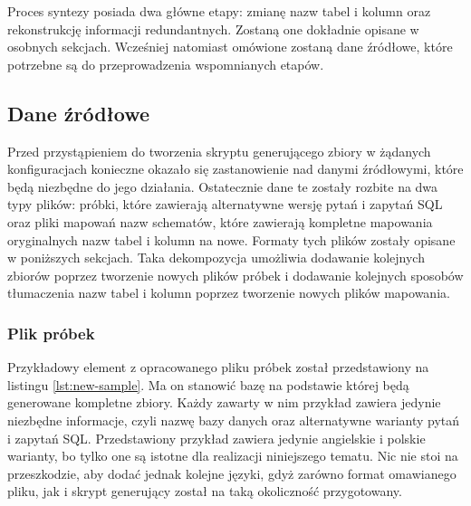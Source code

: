 Proces syntezy posiada dwa główne etapy: zmianę nazw tabel i kolumn oraz rekonstrukcję informacji redundantnych. Zostaną one dokładnie opisane w osobnych sekcjach. Wcześniej natomiast omówione zostaną dane źródłowe, które potrzebne są do przeprowadzenia wspomnianych etapów.

\subsection{Dane źródłowe}
Przed przystąpieniem do tworzenia skryptu generującego zbiory w żądanych konfiguracjach konieczne okazało się zastanowienie nad danymi źródłowymi, które będą niezbędne do jego działania. Ostatecznie dane te zostały rozbite na dwa typy plików: próbki, które zawierają alternatywne wersję pytań i zapytań SQL oraz pliki mapowań nazw schematów, które zawierają kompletne mapowania oryginalnych nazw tabel i kolumn na nowe. Formaty tych plików zostały opisane w poniższych sekcjach. Taka dekompozycja umożliwia dodawanie kolejnych zbiorów poprzez tworzenie nowych plików próbek i dodawanie kolejnych sposobów tłumaczenia nazw tabel i kolumn poprzez tworzenie nowych plików mapowania.

\subsubsection{Plik próbek}
Przykładowy element z opracowanego pliku próbek został przedstawiony na listingu \ref{lst:new-sample}. Ma on stanowić bazę na podstawie której będą generowane kompletne zbiory. Każdy zawarty w nim przykład zawiera jedynie niezbędne informacje, czyli nazwę bazy danych oraz alternatywne warianty pytań i zapytań SQL. Przedstawiony przykład zawiera jedynie angielskie i polskie warianty, bo tylko one są istotne dla realizacji niniejszego tematu. Nic nie stoi na przeszkodzie, aby dodać jednak kolejne języki, gdyż zarówno format omawianego pliku, jak i skrypt generujący został na taką okoliczność przygotowany.

\begin{minipage}{\linewidth}

\end{minipage}

